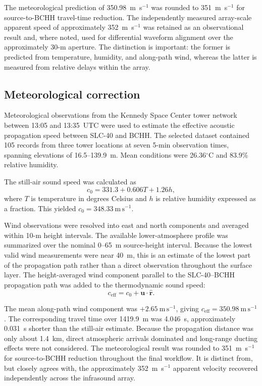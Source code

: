 \documentclass[]{seismica}
\begin{document}
The meteorological prediction of 350.98~m~s$^{-1}$ was rounded to
351~m~s$^{-1}$ for source-to-BCHH travel-time reduction. The independently
measured array-scale apparent speed of approximately 352~m~s$^{-1}$ was
retained as an observational result and, where noted, used for differential
waveform alignment over the approximately 30-m aperture. The distinction is
important: the former is predicted from temperature, humidity, and along-path
wind, whereas the latter is measured from relative delays within the array.


\subsection{Meteorological correction}

Meteorological observations from the Kennedy Space Center tower network between
13:05 and 13:35~UTC were used to estimate the effective acoustic propagation
speed between SLC-40 and BCHH. The selected dataset contained 105 records from
three tower locations at seven 5-min observation times, spanning elevations of
16.5--139.9~m. Mean conditions were 26.36$^\circ$C and 83.9\% relative
humidity.

The still-air sound speed was calculated as
\begin{equation}
  c_0 = 331.3 + 0.606T + 1.26h,
  \label{eq:sound_speed}
\end{equation}
where $T$ is temperature in degrees Celsius and $h$ is relative humidity
expressed as a fraction. This yielded
$c_0=348.33~\mathrm{m\,s^{-1}}$.

Wind observations were resolved into east and north components and averaged
within 10-m height intervals. The available lower-atmosphere profile was
summarized over the nominal 0--65~m source-height interval. Because the lowest
valid wind measurements were near 40~m, this is an estimate of the lowest part
of the propagation path rather than a direct observation throughout the
surface layer. The height-averaged wind component parallel to the
SLC-40--BCHH propagation path was added to the thermodynamic sound speed:
\begin{equation}
  c_{\mathrm{eff}} =
  c_0 + \mathbf{u}\cdot\hat{\mathbf{r}}.
  \label{eq:effective_speed}
\end{equation}

The mean along-path wind component was $+2.65~\mathrm{m\,s^{-1}}$, giving
$c_{\mathrm{eff}}=350.98~\mathrm{m\,s^{-1}}$. The corresponding travel time
over 1419.9~m was 4.046~s, approximately 0.031~s shorter than the still-air
estimate. Because the propagation distance was only about 1.4~km, direct
atmospheric arrivals dominated and long-range ducting effects were not
considered. The meteorological result was rounded to 351~m~s$^{-1}$ for
source-to-BCHH reduction throughout the final workflow. It is distinct from,
but closely agrees with, the approximately 352~m~s$^{-1}$ apparent velocity
recovered independently across the infrasound array.
\end{document}
